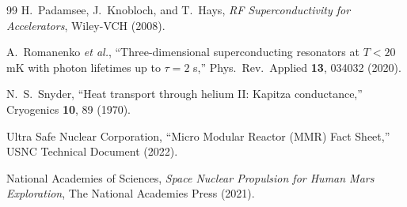 \documentclass[twocolumn,prl,superscriptaddress,nofootinbib,longbibliography,floatfix]{revtex4-2}
\begin{document}
\begin{thebibliography}{99}
H.~Padamsee, J.~Knobloch, and T.~Hays,
\emph{RF Superconductivity for Accelerators},
Wiley-VCH (2008).

A.~Romanenko \emph{et al.},
``Three-dimensional superconducting resonators at $T < 20$ mK with
photon lifetimes up to $\tau = 2$ s,''
Phys.\ Rev.\ Applied \textbf{13}, 034032 (2020).

N.~S.~Snyder,
``Heat transport through helium II: Kapitza conductance,''
Cryogenics \textbf{10}, 89 (1970).

Ultra Safe Nuclear Corporation,
``Micro Modular Reactor (MMR) Fact Sheet,''
USNC Technical Document (2022).

National Academies of Sciences,
\emph{Space Nuclear Propulsion for Human Mars Exploration},
The National Academies Press (2021).

\end{thebibliography}
\end{document}
